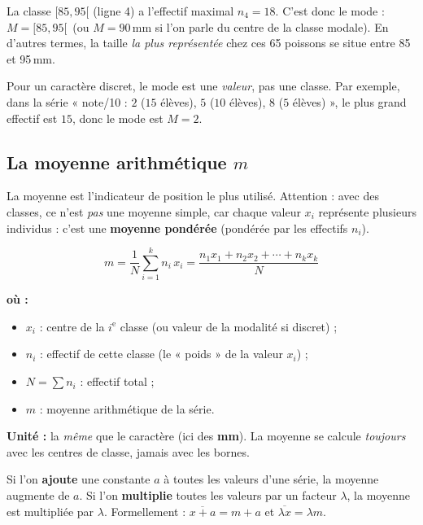 \documentclass[11pt,a4paper]{article}
\newenvironment{ou}{%
  \par\smallskip\noindent\textbf{où :}\nopagebreak
  \begin{itemize}[leftmargin=1.8em,topsep=2pt,itemsep=1.5pt,parsep=0pt]}%
  {\end{itemize}}
\begin{document}
\begin{exemple}
La classe $[85,95[$ (ligne 4) a l'effectif maximal $n_4=18$. C'est donc le mode :
$M=[85,95[$ \,(ou $M=90$\,mm si l'on parle du centre de la classe modale). En d'autres termes,
la taille \emph{la plus représentée} chez ces 65 poissons se situe entre 85 et 95\,mm.
\end{exemple}

\begin{attention}
Pour un caractère discret, le mode est une \emph{valeur}, pas une classe. Par exemple, dans la série
« note/10 : $2$ ($15$ élèves), $5$ ($10$ élèves), $8$ ($5$ élèves) », le plus grand effectif est $15$,
donc le mode est $M=2$.
\end{attention}

\subsection{La moyenne arithmétique $m$}

La moyenne est l'indicateur de position le plus utilisé. Attention : avec des classes, ce n'est
\emph{pas} une moyenne simple, car chaque valeur $x_i$ représente plusieurs individus : c'est une
\textbf{moyenne pondérée} (pondérée par les effectifs $n_i$).

\begin{formule}
\[
\boxed{\;m=\dfrac{1}{N}\sum_{i=1}^{k} n_i\,x_i
      =\dfrac{n_1 x_1+n_2 x_2+\cdots+n_k x_k}{N}\;}
\]
\begin{ou}
  \item $x_i$ : centre de la $i^{\text{e}}$ classe (ou valeur de la modalité si discret) ;
  \item $n_i$ : effectif de cette classe (le « poids » de la valeur $x_i$) ;
  \item $N=\sum n_i$ : effectif total ;
  \item $m$ : moyenne arithmétique de la série.
\end{ou}
\textbf{Unité :} la \emph{même} que le caractère (ici des \textbf{mm}). La moyenne se calcule
\emph{toujours} avec les centres de classe, jamais avec les bornes.
\end{formule}

\begin{theoreme}
Si l'on \textbf{ajoute} une constante $a$ à toutes les valeurs d'une série, la moyenne augmente de
$a$. Si l'on \textbf{multiplie} toutes les valeurs par un facteur $\lambda$, la moyenne est
multipliée par $\lambda$. Formellement : $\overline{x+a}=m+a$ et $\overline{\lambda x}=\lambda m$.
\end{theoreme}
\end{document}
